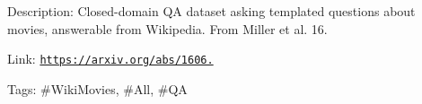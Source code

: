 Description\+: Closed-\/domain QA dataset asking templated questions about movies, answerable from Wikipedia. From Miller et al. \textquotesingle{}16.

Link\+: \href{https://arxiv.org/abs/1606.03126}{\tt https\+://arxiv.\+org/abs/1606.}

Tags\+: \#\+Wiki\+Movies, \#\+All, \#\+QA 